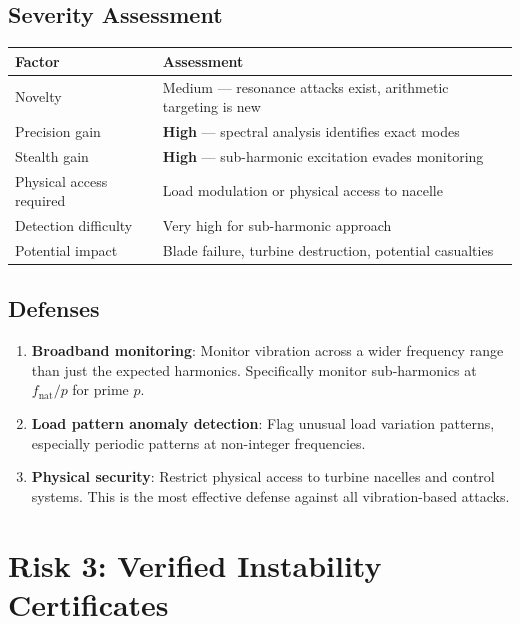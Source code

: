 \documentclass[11pt,a4paper]{article}
\begin{document}
\subsection{Severity Assessment}

\begin{center}
\begin{tabular}{@{}ll@{}}
\toprule
\textbf{Factor} & \textbf{Assessment} \\
\midrule
Novelty & Medium --- resonance attacks exist, arithmetic targeting is new \\
Precision gain & \textbf{High} --- spectral analysis identifies exact modes \\
Stealth gain & \textbf{High} --- sub-harmonic excitation evades monitoring \\
Physical access required & Load modulation or physical access to nacelle \\
Detection difficulty & Very high for sub-harmonic approach \\
Potential impact & Blade failure, turbine destruction, potential casualties \\
\bottomrule
\end{tabular}
\end{center}

\subsection{Defenses}

\begin{enumerate}
  \item \textbf{Broadband monitoring}: Monitor vibration across a
    wider frequency range than just the expected harmonics.
    Specifically monitor sub-harmonics at $f_{\text{nat}}/p$ for
    prime $p$.
  \item \textbf{Load pattern anomaly detection}: Flag unusual load
    variation patterns, especially periodic patterns at non-integer
    frequencies.
  \item \textbf{Physical security}: Restrict physical access to
    turbine nacelles and control systems. This is the most effective
    defense against all vibration-based attacks.
\end{enumerate}

\section{Risk 3: Verified Instability Certificates}
\label{sec:instability}
\end{document}
